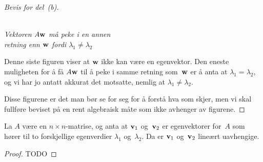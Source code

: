\begin{proof}[Bevis for del~(b)]
\begin{center}
\\
{\small \textit{Vektoren $A \mathbf{w}$ må peke i en annen\\
 retning enn $\mathbf{w}$ fordi $\lambda_1 \ne \lambda_2$}}
\end{center}
Denne siste figuren viser at $\mathbf{w}$ ikke kan være en egenvektor.  Den
eneste muligheten for å få $A \mathbf{w}$ til å peke i samme retning
som~$\mathbf{w}$ er å anta at $\lambda_1 = \lambda_2$, og vi har jo antatt
akkurat det motsatte, nemlig at $\lambda_1 \ne \lambda_2$.

Disse figurene er det man bør se for seg for å forstå hva som skjer,
men vi skal fullføre beviset på en rent algebraisk måte som ikke
avhenger av figurene.

\end{proof}


\begin{thm}
\end{thm}




\begin{lem}
\label{lem:egenvek-lin-uavh-2}
La $A$ være en $n \times n$-matrise, og anta at $\mathbf{v}_1$ og~$\mathbf{v}_2$
er egenvektorer for~$A$ som hører til to forskjellige egenverdier
$\lambda_1$ og~$\lambda_2$.  Da er $\mathbf{v}_1$ og~$\mathbf{v}_2$ lineært
uavhengige.
\end{lem}
\begin{proof}
TODO
\end{proof}

